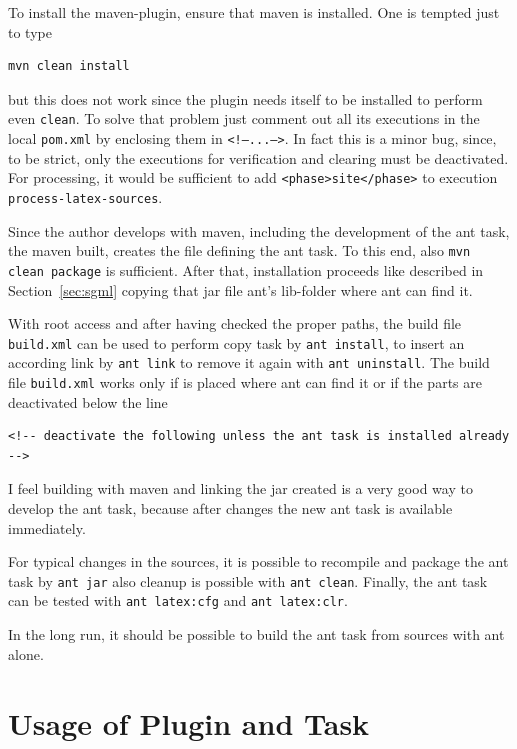 \documentclass[12pt]{book}
\renewcommand{\index}[1]{ }
\begin{document}
To install the maven-plugin, ensure that maven is installed. 
One is tempted just to type 
%
\begin{Verbatim}
mvn clean install
\end{Verbatim}
%
but this does not work since the plugin needs itself to be installed
to perform even \texttt{clean}.
To solve that problem just comment out all its executions
in the local \texttt{pom.xml} by enclosing them in \texttt{<!--...-->}.
In fact this is a minor bug, since, to be strict, only
the executions for verification and clearing must be deactivated.
For processing, it would be sufficient to add
\texttt{<phase>site</phase>} to execution \texttt{process-latex-sources}.
\medskip


Since the author develops with maven,
including the development of the ant task,
the maven built, creates the file \createdJar{}
defining the ant task.
To this end, also \texttt{mvn clean package} is sufficient.
After that, installation proceeds like described in Section~\ref{sec:sgml}
copying that jar file ant's lib-folder where ant can find it.

With root access and after having checked the proper paths,
the build file \texttt{build.xml} can be used 
to perform copy task by \texttt{ant install},
to insert an according link by \texttt{ant link}
to remove it again with \texttt{ant uninstall}.
The build file \texttt{build.xml} works only
if \createdJar{} is placed where ant can find it
or if the parts are deactivated below the line
%
\begin{Verbatim}
<!-- deactivate the following unless the ant task is installed already -->
\end{Verbatim}

I feel building with maven and linking the jar created
is a very good way to develop the ant task,
because after changes the new ant task is available immediately.

For typical changes in the sources,
it is possible to recompile and package the ant task
by \texttt{ant jar} also cleanup is possible with \texttt{ant clean}.
Finally, the ant task can be tested with \texttt{ant latex:cfg}
and \texttt{ant latex:clr}. 

In the long run, it should be possible to build the ant task from sources
with ant alone.
\index{ant-task}



\chapter{Usage of Plugin and Task}\label{chap:usage}
\end{document}
